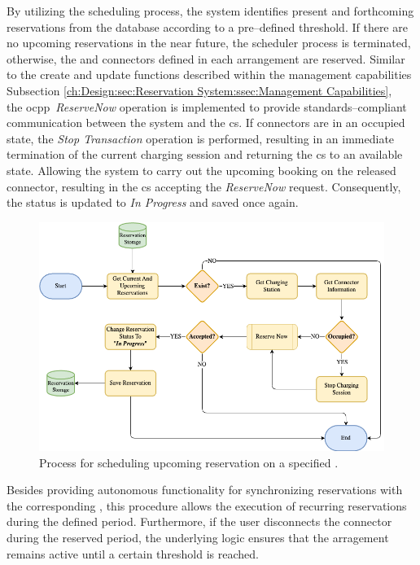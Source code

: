 By utilizing the scheduling process, the system identifies present and forthcoming reservations from the database according to a pre--defined threshold. 
If there are no upcoming reservations in the near future, the scheduler process is terminated, otherwise, the  and connectors defined in each arrangement are reserved.
Similar to the create and update functions described within the management capabilities Subsection \ref{ch:Design:sec:Reservation System:ssec:Management Capabilities}, \\ the \acrshort{ocpp}~\textit{ReserveNow} operation \cite{noauthor_ocpp_nodate} is implemented to provide standards--compliant communication between the system and the \acrshort{cs}.
If connectors are in an occupied state, the \textit{Stop Transaction} operation is performed, resulting in an immediate termination of the current charging session and returning the \acrshort{cs} to an available state.
Allowing the system to carry out the upcoming booking on the released connector, resulting in the \acrshort{cs} accepting the \textit{ReserveNow} request.
Consequently, the status is updated to \textit{In Progress} and saved once again.

\begin{figure}[h]
    \centering
    \includegraphics[scale=0.4]{resources/images/main/5_design/processes/scheduler/SynchronizeReservation.png}
    \caption{Process for scheduling upcoming reservation on a specified .}
    \label{fig:schedule-reservation-flowchart}
\end{figure}

\noindent Besides providing autonomous functionality for synchronizing reservations with the corresponding , this procedure allows the execution of recurring reservations during the defined period. 
Furthermore, if the user disconnects the connector during the reserved period, the underlying logic ensures that the arragement remains active until a certain threshold is reached.


